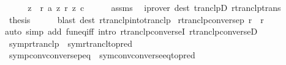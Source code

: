 \begin{isabellebody}
%
\isadelimproof
%
\endisadelimproof
%
\isatagproof
{}\isamarkupfalse%
\ {\isacharminus}{\kern0pt}\isanewline
\ \ \isamarkupfalse%
\ z\ \ {\isachardoublequoteopen}r\ a\ z{\isachardoublequoteclose}\ {\isachardoublequoteopen}r\isactrlsup {\isacharasterisk}{\kern0pt}\isactrlsup {\isacharasterisk}{\kern0pt}\ z\ c{\isachardoublequoteclose}\isanewline
\ \ \ \ \isamarkupfalse%
\ assms\ \isamarkupfalse%
\ {\isacharparenleft}{\kern0pt}iprover\ dest{\isacharcolon}{\kern0pt}\ tranclpD\ rtranclp{\isacharunderscore}{\kern0pt}trans{\isacharparenright}{\kern0pt}\isanewline
\ \ \isamarkupfalse%
\ \isamarkupfalse%
\ {\isacharquery}{\kern0pt}thesis\isanewline
\ \ \ \ \isamarkupfalse%
\ {\isacharparenleft}{\kern0pt}blast\ dest{\isacharcolon}{\kern0pt}\ rtranclp{\isacharunderscore}{\kern0pt}into{\isacharunderscore}{\kern0pt}tranclp{}{\isacharparenright}{\kern0pt}\isanewline
{}\isamarkupfalse%
%
\endisatagproof
{\isafoldproof}%
%
\isadelimproof
\isanewline
%
\endisadelimproof
\isanewline
{}\isamarkupfalse%
\ rtranclp{\isacharunderscore}{\kern0pt}conversep{\isacharcolon}{\kern0pt}\ {\isachardoublequoteopen}r{\isasyminverse}{\isasyminverse}\isactrlsup {\isacharasterisk}{\kern0pt}\isactrlsup {\isacharasterisk}{\kern0pt}\ {\isacharequal}{\kern0pt}\ r\isactrlsup {\isacharasterisk}{\kern0pt}\isactrlsup {\isacharasterisk}{\kern0pt}{\isasyminverse}{\isasyminverse}{\isachardoublequoteclose}\isanewline
%
\isadelimproof
\ \ %
\endisadelimproof
%
\isatagproof
{}\isamarkupfalse%
{\isacharparenleft}{\kern0pt}auto\ simp\ add{\isacharcolon}{\kern0pt}\ fun{\isacharunderscore}{\kern0pt}eq{\isacharunderscore}{\kern0pt}iff\ intro{\isacharcolon}{\kern0pt}\ rtranclp{\isacharunderscore}{\kern0pt}converseI\ rtranclp{\isacharunderscore}{\kern0pt}converseD{\isacharparenright}{\kern0pt}%
\endisatagproof
{\isafoldproof}%
%
\isadelimproof
\isanewline
%
\endisadelimproof
\isanewline
{}\isamarkupfalse%
\ symp{\isacharunderscore}{\kern0pt}rtranclp\ {\isacharequal}{\kern0pt}\ sym{\isacharunderscore}{\kern0pt}rtrancl{\isacharbrackleft}{\kern0pt}to{\isacharunderscore}{\kern0pt}pred{\isacharbrackright}{\kern0pt}\isanewline
\isanewline
{}\isamarkupfalse%
\ symp{\isacharunderscore}{\kern0pt}conv{\isacharunderscore}{\kern0pt}conversep{\isacharunderscore}{\kern0pt}eq\ {\isacharequal}{\kern0pt}\ sym{\isacharunderscore}{\kern0pt}conv{\isacharunderscore}{\kern0pt}converse{\isacharunderscore}{\kern0pt}eq{\isacharbrackleft}{\kern0pt}to{\isacharunderscore}{\kern0pt}pred{\isacharbrackright}{\kern0pt}\isanewline

\end{isabellebody}
